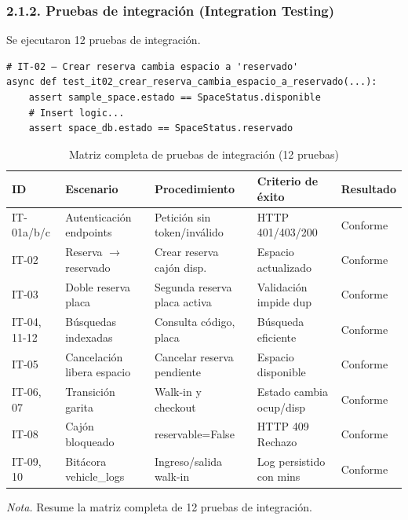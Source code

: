 \subsubsection{2.1.2. Pruebas de integración (Integration Testing)}




Se ejecutaron 12 pruebas de integración.

\begin{verbatim}
# IT-02 — Crear reserva cambia espacio a 'reservado'
async def test_it02_crear_reserva_cambia_espacio_a_reservado(...):
    assert sample_space.estado == SpaceStatus.disponible
    # Insert logic...
    assert space_db.estado == SpaceStatus.reservado
\end{verbatim}

\begin{table}[htbp]
\caption{Matriz completa de pruebas de integración (12 pruebas)}
\label{tab:matriz_it}
\begin{tabular}{@{}p{2cm} p{4cm} p{4cm} p{3cm} p{2cm}@{}}
\toprule
\textbf{ID} & \textbf{Escenario} & \textbf{Procedimiento} & \textbf{Criterio de éxito} & \textbf{Resultado} \\
\midrule
IT-01a/b/c & Autenticación endpoints & Petición sin token/inválido & HTTP 401/403/200 & Conforme \\
IT-02 & Reserva $\rightarrow$ reservado & Crear reserva cajón disp. & Espacio actualizado & Conforme \\
IT-03 & Doble reserva placa & Segunda reserva placa activa & Validación impide dup & Conforme \\
IT-04, 11-12 & Búsquedas indexadas & Consulta código, placa & Búsqueda eficiente & Conforme \\
IT-05 & Cancelación libera espacio & Cancelar reserva pendiente & Espacio disponible & Conforme \\
IT-06, 07 & Transición garita & Walk-in y checkout & Estado cambia ocup/disp & Conforme \\
IT-08 & Cajón bloqueado & reservable=False & HTTP 409 Rechazo & Conforme \\
IT-09, 10 & Bitácora vehicle\_logs & Ingreso/salida walk-in & Log persistido con mins & Conforme \\
\bottomrule
\end{tabular}
\par\vspace{0.2cm}
\textit{Nota.} Resume la matriz completa de 12 pruebas de integración.
\end{table}

